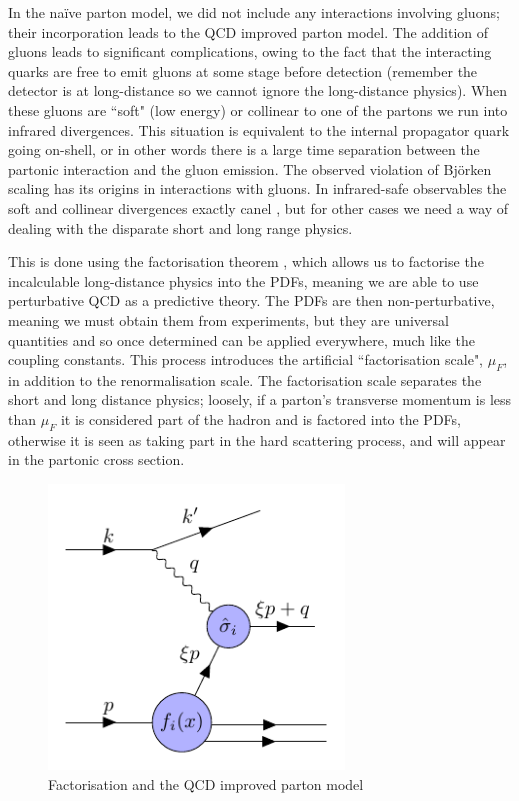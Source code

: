 In the na\"ive parton model, we did not include any interactions involving gluons; their incorporation leads to the QCD improved parton model. The addition of gluons leads to significant complications, owing to the fact that the interacting quarks are free to emit gluons at some stage before detection (remember the detector is at long-distance so we cannot ignore the long-distance physics). When these gluons are ``soft" (low energy) or collinear to one of the partons we run into infrared divergences. This situation is equivalent to the internal propagator quark going on-shell, or in other words there is a large time separation between the partonic interaction and the gluon emission. The observed violation of Bj\"orken scaling has its origins in interactions with gluons. In infrared-safe observables the soft and collinear divergences exactly canel \cite{Kinoshita:1962ur, Lee:1964is}, but for other cases we need a way of dealing with the disparate short and long range physics. 

This is done using the factorisation theorem \cite{Collins:1989gx}, which allows us to factorise the incalculable long-distance physics into the PDFs, meaning we are able to use perturbative QCD as a predictive theory. The PDFs are then non-perturbative, meaning we must obtain them from experiments, but they are universal quantities and so once determined can be applied everywhere, much like the coupling constants. This process introduces the artificial ``factorisation scale", $\mu_F$, in addition to the renormalisation scale. The factorisation scale separates the short and long distance physics; loosely, if a parton's transverse momentum is less than $\mu_F$ it is considered part of the hadron and is factored into the PDFs, otherwise it is seen as taking part in the hard scattering process, and will appear in the partonic cross section.

\begin{figure}[H]
\centering
\includegraphics[width=0.7\textwidth]{../diagrams/improvedparton_dis.pdf}
\caption{\label{fig:improvedparton} Factorisation and the QCD improved parton model}
\end{figure}


